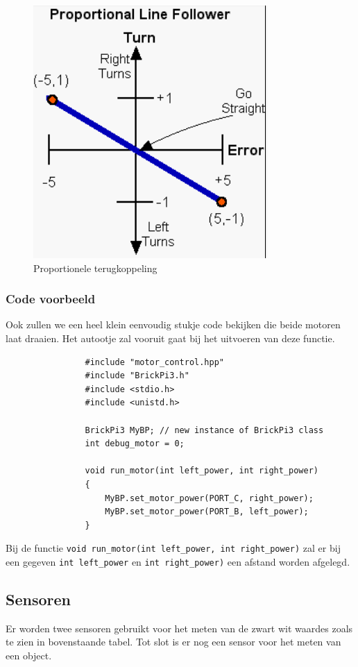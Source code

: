 \documentclass[12pt]{article}
\begin{document}
		\begin{center}
			\begin{figure}
				\includegraphics[scale=0.7]{proportional}
				\caption{Proportionele terugkoppeling}
			\end{figure}
		\end{center}
\newpage
		\subsubsection{Code voorbeeld}
			Ook zullen we een heel klein eenvoudig stukje code bekijken die beide motoren laat draaien. Het autootje zal vooruit gaat bij het uitvoeren van deze functie.
			\begin{lstlisting}
				#include "motor_control.hpp"
				#include "BrickPi3.h"
				#include <stdio.h>
				#include <unistd.h>
				
				BrickPi3 MyBP; // new instance of BrickPi3 class
				int debug_motor = 0;
				
				void run_motor(int left_power, int right_power)
				{
				    MyBP.set_motor_power(PORT_C, right_power);
				    MyBP.set_motor_power(PORT_B, left_power);
				}
			\end{lstlisting}
			Bij de functie \texttt{void run\_motor(int left\_power, int right\_power)} zal er bij een gegeven \texttt{int left\_power} en \texttt{int right\_power)} een afstand worden afgelegd.
		
		
	\subsection{Sensoren}
		Er worden twee sensoren gebruikt voor het meten van de zwart wit waardes zoals te zien in bovenstaande tabel. Tot slot is er nog een sensor voor het meten van een object.
		
\end{document}
